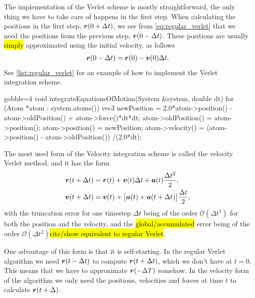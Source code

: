 The implementation of the Verlet scheme is mostly straightforward, the only thing we have to take care of happens in the first step. When calculating the positions in the first step, $\boldsymbol{r}(0+\Delta t)$, we see from \cref{eq:regular_verlet} that we need the positions from the previous step, $\boldsymbol{r}(0-\Delta t)$. These positions are usually \hl{simply} approximated using the initial velocity, as follows
\begin{align*}
    \boldsymbol{r}(0-\Delta t) = \boldsymbol{r}(0) - \boldsymbol{v}(0)\Delta t.
\end{align*}
See \cref{list:regular_verlet} for an example of how to implement the Verlet integration scheme.
%
\begin{listing}[!htb]%
\begin{cppcode*}{gobble=4}
    void integrateEquationsOfMotion(System &system, double dt)
    {
        for (Atom *atom : system.atoms())
        {
            vec3 newPosition = 2.0*atom->position() - atom->oldPosition() 
                               + atom->force()*dt*dt;
            atom->oldPosition() = atom->position();
            atom->position() = newPosition;
            atom->velocity() = (atom->position() - atom->oldPosition())
                               /(2.0*dt);
        }
    }
\end{cppcode*}%
\caption{%
    Caption.%
    \label{list:regular_verlet}%
}%
\end{listing}%

The most used form of the Velocity integration scheme is called the velocity Verlet method\cite{swope1982computer}, and it has the form
\begin{align}
    \boldsymbol{r}(t + \Delta t) &= \boldsymbol{r}(t) + \boldsymbol{v}(t)\Delta t + \boldsymbol{a}(t)\frac{\Delta t^2}{2}, \label{eq:velocity_verlet_position}\\
    \boldsymbol{v}(t + \Delta t) &= \boldsymbol{v}(t) + \big[\boldsymbol{a}(t) + \boldsymbol{a}(t + \Delta t)\big] \frac{\Delta t}{2}, \label{eq:velocity_verlet_velocity}
\end{align}
with the truncation error for one timestep $\Delta t$ being of the order $\mathcal{O}(\Delta t^3)$ for both the position and the velocity, and the \hl{global/accumulated} error being of the order $\mathcal{O}(\Delta t^2)$\hl{cite/show equivalent to regular Verlet}. 

One advantage of this form is that it is self-starting. In the regular Verlet algorithm we need $\boldsymbol{r}(t-\Delta t)$ to compute $\boldsymbol{r}(t+\Delta t)$, which we don't have at $t = 0$. This means that we have to approximate $\boldsymbol{r}(-\Delta T)$ somehow. In the velocity form of the algorithm we only need the positions, velocities and forces at time $t$ to calculate $\boldsymbol{r}(t+\Delta)$.

